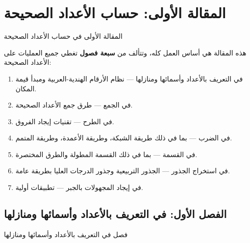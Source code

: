 \documentclass[11pt,a4paper]{book}
\newcommand{\ar}[1]{\arabicfont\beginR #1\endR}
\newcommand{\arLarge}[1]{{\Large\arabicfont\beginR #1\endR}}
\newcommand{\arHuge}[1]{{\Huge\arabicfont\beginR #1\endR}}
\newenvironment{arabicbox}{%
  \begin{framed}
  \begin{minipage}{\linewidth-2\fboxsep-2\fboxrule}
  \setlength{\parindent}{0pt}
  \linespread{1.3}\selectfont
}{%
  \end{minipage}
  \end{framed}
}
\begin{document}
\chapter{\ar{المقالة الأولى: حساب الأعداد الصحيحة}}
\label{ch:treatise1}

\begin{arabicbox}
\begin{center}
\arHuge{المقالة الأولى في حساب الأعداد الصحيحة}
\end{center}
\end{arabicbox}

\vspace{0.5cm}

\noindent\ar{هذه المقالة هي أساس العمل كله، وتتألف من \textbf{سبعة فصول} تغطي جميع العمليات على الأعداد الصحيحة:}

\begin{enumerate}[label=\textbf{\ar{فصل} \arabic*:}]
  \item \ar{في التعريف بالأعداد وأسمائها ومنازلها — نظام الأرقام الهندية-العربية ومبدأ قيمة المكان.}
  \item \ar{في الجمع — طرق جمع الأعداد الصحيحة.}
  \item \ar{في الطرح — تقنيات إيجاد الفروق.}
  \item \ar{في الضرب — بما في ذلك طريقة الشبكة، وطريقة الأعمدة، وطريقة المتمم.}
  \item \ar{في القسمة — بما في ذلك القسمة المطولة والطرق المختصرة.}
  \item \ar{في استخراج الجذور — الجذور التربيعية وجذور الدرجات العليا بطريقة عامة.}
  \item \ar{في إيجاد المجهولات بالجبر — تطبيقات أولية.}
\end{enumerate}

\section{\ar{الفصل الأول: في التعريف بالأعداد وأسمائها ومنازلها}}

\begin{arabicbox}
\begin{center}
\arLarge{فصل في التعريف بالأعداد وأسمائها ومنازلها}
\end{center}
\end{arabicbox}
\end{document}

